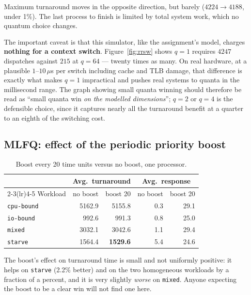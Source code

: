 \documentclass[11pt,a4paper]{article}
\begin{document}
Maximum turnaround moves in the opposite direction, but barely ($4224
\rightarrow 4188$, under 1\%). The last process to finish is limited by total
system work, which no quantum choice changes.

The important caveat is that this simulator, like the assignment's model,
charges \textbf{nothing for a context switch}. Figure~\ref{fig:rrsw} shows
$q{=}1$ requires $4247$ dispatches against $215$ at $q{=}64$ --- twenty times
as many. On real hardware, at a plausible $1$--$10\,\mu$s per switch including
cache and TLB damage, that difference is exactly what makes $q{=}1$
impractical and pushes real systems to quanta in the millisecond range. The
graph showing small quanta winning should therefore be read as ``small quanta
win \emph{on the modelled dimensions}''; $q{=}2$ or $q{=}4$ is the defensible
choice, since it captures nearly all the turnaround benefit at a quarter to an
eighth of the switching cost.

\subsection{MLFQ: effect of the periodic priority boost}

\begin{table}[h]
\centering
\begin{tabular}{lrrrr}
\toprule
& \multicolumn{2}{c}{Avg.\ turnaround} & \multicolumn{2}{c}{Avg.\ response} \\
\cmidrule(lr){2-3}\cmidrule(lr){4-5}
Workload & no boost & boost 20 & no boost & boost 20 \\
\midrule
\texttt{cpu-bound} & 5162.9 & 5155.8 & \phantom{0}0.3 & 29.1 \\
\texttt{io-bound}  & \phantom{0}992.6 & \phantom{0}991.3 & \phantom{0}0.8 & 25.0 \\
\texttt{mixed}     & 3032.1 & 3042.6 & \phantom{0}1.1 & 29.4 \\
\texttt{starve}    & 1564.4 & \textbf{1529.6} & \phantom{0}5.4 & 24.6 \\
\bottomrule
\end{tabular}
\caption{Boost every 20 time units versus no boost, one processor.}
\label{tab:boost}
\end{table}

The boost's effect on turnaround time is small and not uniformly positive: it
helps on \texttt{starve} (2.2\% better) and on the two homogeneous workloads by
a fraction of a percent, and it is very slightly \emph{worse} on
\texttt{mixed}. Anyone expecting the boost to be a clear win will not find one
here.
\end{document}
